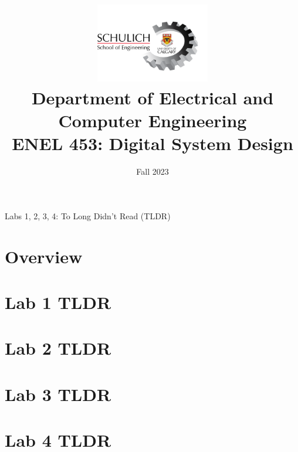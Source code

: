 \documentclass{article}
\title{
  \includegraphics[width=5cm]{Images/Logo.png}\\
  \normalsize Department of Electrical and Computer Engineering\\
  ENEL 453: Digital System Design
}
\date{Fall 2023}
\makeatletter
\renewcommand{\maketitle}{%
  \begin{center}
    {\@title}
    \vspace{1cm} %
    {\@date}
  \end{center}
}
\makeatother
\begin{document}
\centering

\maketitle
\large Labs 1, 2, 3, 4: To Long Didn't Read (TLDR)  \\


\RaggedRight
\section{Overview}
    
\section{Lab 1 TLDR}
    
\section{Lab 2 TLDR}
    
\section{Lab 3 TLDR}
    
\section{Lab 4 TLDR}
    
\end{document}
